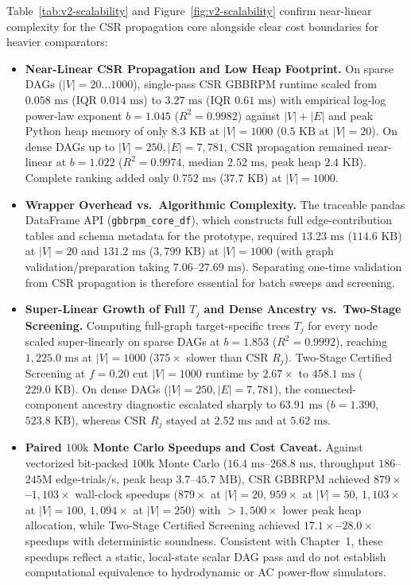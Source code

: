 Table~\ref{tab:v2-scalability} and Figure~\ref{fig:v2-scalability}
confirm near-linear complexity for the CSR propagation core alongside
clear cost boundaries for heavier comparators:
\begin{itemize}[leftmargin=*]
\item \textbf{Near-Linear CSR Propagation and Low Heap Footprint.} On
sparse DAGs ($|V| = 20 \dots 1000$), single-pass CSR GBBRPM runtime
scaled from $0.058\text{ ms}$ (IQR $0.014\text{ ms}$) to
$3.27\text{ ms}$ (IQR $0.61\text{ ms}$) with empirical log-log power-law
exponent $b = 1.045$ ($R^2 = 0.9982$) against $|V|+|E|$ and peak Python
heap memory of only $8.3\text{ KB}$ at $|V|=1000$ ($0.5\text{ KB}$ at
$|V|=20$). On dense DAGs up to $|V|=250, |E|=7,781$, CSR propagation
remained near-linear at $b = 1.022$ ($R^2 = 0.9974$, median
$2.52\text{ ms}$, peak heap $2.4\text{ KB}$). Complete ranking added
only $0.752\text{ ms}$ ($37.7\text{ KB}$) at $|V|=1000$.
\item \textbf{Wrapper Overhead vs.\ Algorithmic Complexity.} The
traceable pandas DataFrame API (\texttt{gbbrpm\_core\_df}), which
constructs full edge-contribution tables and schema metadata for the
prototype, required $13.23\text{ ms}$ ($114.6\text{ KB}$) at $|V|=20$
and $131.2\text{ ms}$ ($3,799\text{ KB}$) at $|V|=1000$ (with graph
validation/preparation taking $7.06$--$27.69\text{ ms}$). Separating
one-time validation from CSR propagation is therefore essential for
batch sweeps and screening.
\item \textbf{Super-Linear Growth of Full $T_j$ and Dense Ancestry vs.\
Two-Stage Screening.} Computing full-graph target-specific trees $T_j$
for every node scaled super-linearly on sparse DAGs at $b = 1.853$
($R^2 = 0.9992$), reaching $1,225.0\text{ ms}$ at $|V|=1000$
($375\times$ slower than CSR $R_j$). Two-Stage Certified Screening at
$f=0.20$ cut $|V|=1000$ runtime by $2.67\times$ to $458.1\text{ ms}$
($229.0\text{ KB}$). On dense DAGs ($|V|=250, |E|=7,781$), the
connected-component ancestry diagnostic escalated sharply to
$63.91\text{ ms}$ ($b = 1.390$, $523.8\text{ KB}$), whereas CSR $R_j$
stayed at $2.52\text{ ms}$ and \citet{abbe2020} at $5.62\text{ ms}$.
\item \textbf{Paired $100\text{k}$ Monte Carlo Speedups and Cost
Caveat.} Against vectorized bit-packed $100\text{k}$ Monte Carlo
($16.4\text{ ms}$--$268.8\text{ ms}$, throughput $186$--$245\text{M}$
edge-trials/s, peak heap $3.7$--$45.7\text{ MB}$), CSR GBBRPM achieved
\textbf{$879\times$--$1,103\times$} wall-clock speedups ($879\times$ at
$|V|=20$, $959\times$ at $|V|=50$, $1,103\times$ at $|V|=100$,
$1,094\times$ at $|V|=250$) with $>1{,}500\times$ lower peak heap
allocation, while Two-Stage Certified Screening achieved
\textbf{$17.1\times$--$28.0\times$} speedups with deterministic
soundness. Consistent with Chapter~1, these speedups reflect a static,
local-state scalar DAG pass and do not establish computational
equivalence to hydrodynamic or AC power-flow simulators.
\end{itemize}

